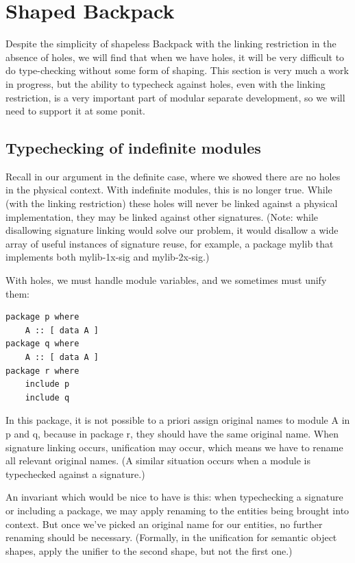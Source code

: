 \documentclass{article}
\begin{document}
\section{Shaped Backpack}

Despite the simplicity of shapeless Backpack with the linking
restriction in the absence of holes, we will find that when we have
holes, it will be very difficult to do type-checking without
some form of shaping.  This section is very much a work in progress,
but the ability to typecheck against holes, even with the linking restriction,
is a very important part of modular separate development, so we will need
to support it at some ponit.

\subsection{Typechecking of indefinite modules}\label{sec:typechecking-indefinite}

Recall in our argument in the definite case, where we showed there are
no holes in the physical context.  With indefinite modules, this is no
longer true. While (with the linking restriction) these holes will never
be linked against a physical implementation, they may be linked against
other signatures.  (Note: while disallowing signature linking would
solve our problem, it would disallow a wide array of useful instances of
signature reuse, for example, a package mylib that implements both
mylib-1x-sig and mylib-2x-sig.)

With holes, we must handle module variables, and we sometimes must unify them:

\begin{verbatim}
package p where
    A :: [ data A ]
package q where
    A :: [ data A ]
package r where
    include p
    include q
\end{verbatim}

In this package, it is not possible to a priori assign original names to
module A in p and q, because in package r, they should have the same
original name.  When signature linking occurs, unification may occur,
which means we have to rename all relevant original names. (A similar
situation occurs when a module is typechecked against a signature.)

An invariant which would be nice to have is this: when typechecking a
signature or including a package, we may apply renaming to the entities
being brought into context.  But once we've picked an original name for
our entities, no further renaming should be necessary. (Formally, in the
unification for semantic object shapes, apply the unifier to the second
shape, but not the first one.)
\end{document}
